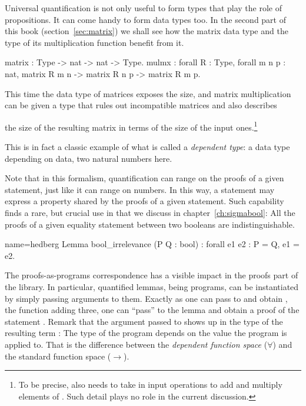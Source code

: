Universal quantification is not only useful to form types that
play the role of propositions.  It can come handy to form data types
too.  In the second part of this book (section~\ref{sec:matrix})
we shall see how the matrix data type
and the type of its multiplication function benefit from it.

\begin{coq}{}{}
matrix : Type -> nat -> nat -> Type.
mulmx : forall R : Type, forall m n p : nat,
  matrix R m n -> matrix R n p -> matrix R m p.
\end{coq}

This time the data type of matrices exposes the size, and matrix multiplication
can be given a type that rules out incompatible matrices and also describes

the size of the resulting matrix in terms of the size of the input
ones.\footnote{To be precise,  also needs to take in input operations to
add and multiply elements of .  Such detail plays no role in the current
discussion.}

This is in fact a classic example of what is called a \emph{dependent type}: a
data type depending on data, two natural numbers here.

Note that in this formalism, quantification can range on the proofs of
a given statement, just like it can range on numbers. In this way, a
statement may express
a property shared by the proofs of a given statement. Such capability
finds a rare, but
crucial use in \mcbMC{} that we discuss in chapter~\ref{ch:sigmabool}:
All the proofs of a given equality statement between two booleans are
indistinguishable.

\begin{coq}{name=hedberg}{}
Lemma bool_irrelevance (P Q : bool) : forall e1 e2 : P = Q, e1 = e2.
\end{coq}


The proofs-as-programs correspondence has a visible impact in the proofs
part of the \mcbMC{} library.  In particular, quantified lemmas, being programs,
can be instantiated by simply passing arguments to them.  Exactly as one can
pass  to  and obtain , the function adding three, one
can ``pass''  to the lemma  and obtain a proof of the statement
.  Remark that the argument passed to 
shows up in the type of the resulting term :  The type of the
 program depends on the value the program is applied to.  That is the
difference between the \emph{dependent function space} ($\forall$)
and the standard function space ($\to$).

